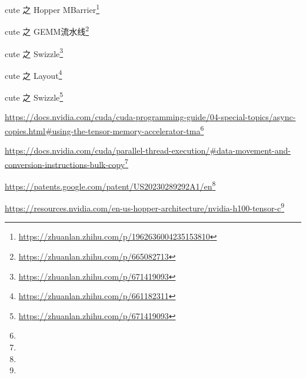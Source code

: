 cute 之 Hopper MBarrier\footnote{\url{https://zhuanlan.zhihu.com/p/1962636004235153810}}

cute 之 GEMM流水线\footnote{\url{https://zhuanlan.zhihu.com/p/665082713}}

cute 之 Swizzle\footnote{\url{https://zhuanlan.zhihu.com/p/671419093}}

cute 之 Layout\footnote{\url{https://zhuanlan.zhihu.com/p/661182311}}

cute 之 Swizzle\footnote{\url{https://zhuanlan.zhihu.com/p/671419093}}

\url{https://docs.nvidia.com/cuda/cuda-programming-guide/04-special-topics/async-copies.html#using-the-tensor-memory-accelerator-tma}\footnote{\reedIXurlA}

\url{https://docs.nvidia.com/cuda/parallel-thread-execution/#data-movement-and-conversion-instructions-bulk-copy}\footnote{\reedIXurlB}

\url{https://patents.google.com/patent/US20230289292A1/en}\footnote{\reedIXurlC}

\url{https://resources.nvidia.com/en-us-hopper-architecture/nvidia-h100-tensor-c}\footnote{\reedIXurlD}
